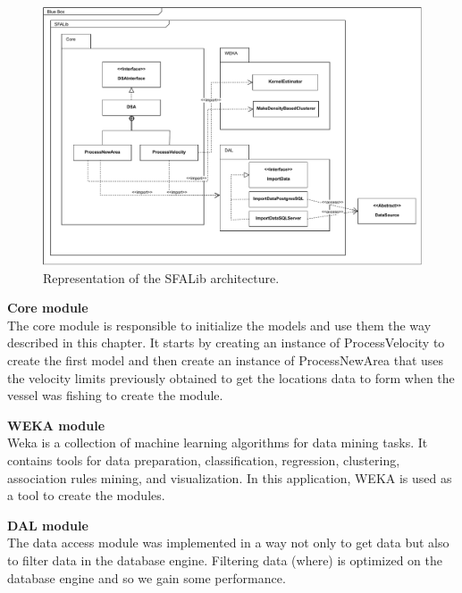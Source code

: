 \begin{figure}[h]
    \centering
    \includegraphics[width=1.0\linewidth]{Chapters/img/SFALib_Prof.pdf}
    \caption{Representation of the SFALib architecture.}
    \label{fig:SFALib_Prof}
\end{figure}



\textbf{Core module} \\The core module is responsible to initialize the models and use them the way described in this chapter. It starts by creating an instance of ProcessVelocity to create the first model and then create an instance of ProcessNewArea that uses the velocity limits previously obtained to get the locations data to form when the vessel was fishing to create the module.

\textbf{WEKA module} \\Weka is a collection of machine learning algorithms for data mining tasks. It contains tools for data preparation, classification, regression, clustering, association rules mining, and visualization. In this application, WEKA is used as a tool to create the modules.

\textbf{DAL module} \\The data access module was implemented in a way not only to get data but also to filter data in the database engine. Filtering data (where) is optimized on the database engine and so we gain some performance.




